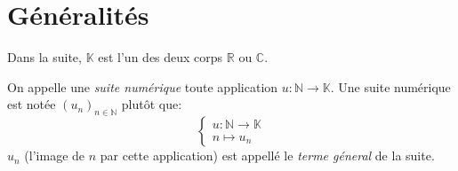 \section{Généralités}
    Dans la suite, \(\mathbb{K}\) est l'un des deux corps \(\mathbb{R}\) ou \(\mathbb{C}\).
    \begin{definition}
        On appelle une \emph{suite numérique} toute application \(u:\mathbb{N} \rightarrow \mathbb{K}\).
        Une suite numérique est notée \((u_n)_{n \in \mathbb{N}}\) plutôt que:
        \[
            \left\{
                \begin{array}{l}
                    u: \mathbb{N} \rightarrow \mathbb{K}\\
                    n \mapsto u_n
                \end{array}
            \right.    
        \]
        \(u_n\) (l'image de \(n\) par cette application) est appellé le \emph{terme géneral} de la suite.
    \end{definition}